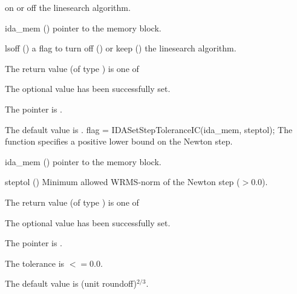 {{  on or off the linesearch algorithm.
}
{
  \begin{args}
  \item[ida\_mem] ()
    pointer to the {\ida} memory block.
  \item[lsoff] ()
    a flag to turn off () or keep () the linesearch
    algorithm.
  \end{args}
}
{
  The return value  (of type ) is one of
  \begin{args}
  \item[\Id{IDA\_SUCCESS}]
    The optional value has been successfully set.
  \item[\Id{IDA\_MEM\_NULL}]
    The  pointer is .
  \end{args}
}
{
  The default value is .
}
{
flag = IDASetStepToleranceIC(ida\_mem, steptol);
}
{
  The function  specifies a positive lower bound
  on the Newton step.
}
{
  \begin{args}
  \item[ida\_mem] ()
    pointer to the {\ida} memory block.
  \item[steptol] ()
    Minimum allowed WRMS-norm of the Newton step ($> 0.0$).
  \end{args}
}
{
  The return value  (of type ) is one of
  \begin{args}
  \item[\Id{IDA\_SUCCESS}]
    The optional value has been successfully set.
  \item[\Id{IDA\_MEM\_NULL}]
    The  pointer is .
  \item[\Id{IDA\_ILL\_INPUT}]
    The  tolerance is  $<= 0.0$.
  \end{args}
}
{
  The default value is (unit roundoff)$^{2/3}$.
}



}
